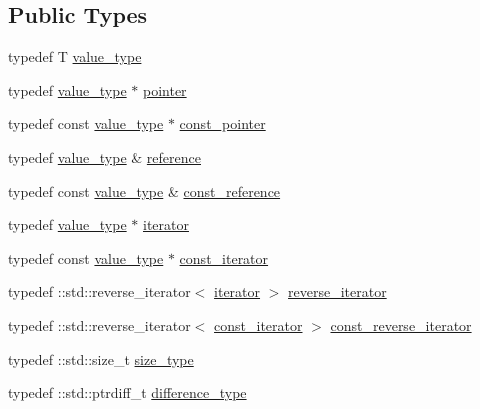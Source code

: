 \subsection*{Public Types}
\begin{DoxyCompactItemize}
\item 
typedef T \hyperlink{classtrimesh_1_1XForm_af259af02eaea86d3451dc23a47ad896c}{value\+\_\+type}
\item 
typedef \hyperlink{classtrimesh_1_1XForm_af259af02eaea86d3451dc23a47ad896c}{value\+\_\+type} $\ast$ \hyperlink{classtrimesh_1_1XForm_a0ff7a6cb20d209f32be3ab3779077029}{pointer}
\item 
typedef const \hyperlink{classtrimesh_1_1XForm_af259af02eaea86d3451dc23a47ad896c}{value\+\_\+type} $\ast$ \hyperlink{classtrimesh_1_1XForm_a0cfc3dd93b0190520e3152ef27a32117}{const\+\_\+pointer}
\item 
typedef \hyperlink{classtrimesh_1_1XForm_af259af02eaea86d3451dc23a47ad896c}{value\+\_\+type} \& \hyperlink{classtrimesh_1_1XForm_afef5285ff7d9ea2e25a4bb4d966bd674}{reference}
\item 
typedef const \hyperlink{classtrimesh_1_1XForm_af259af02eaea86d3451dc23a47ad896c}{value\+\_\+type} \& \hyperlink{classtrimesh_1_1XForm_a33bd450d8902f70aaf7d4bf9fec01502}{const\+\_\+reference}
\item 
typedef \hyperlink{classtrimesh_1_1XForm_af259af02eaea86d3451dc23a47ad896c}{value\+\_\+type} $\ast$ \hyperlink{classtrimesh_1_1XForm_a8894e55e986e53231663e774060ca200}{iterator}
\item 
typedef const \hyperlink{classtrimesh_1_1XForm_af259af02eaea86d3451dc23a47ad896c}{value\+\_\+type} $\ast$ \hyperlink{classtrimesh_1_1XForm_af342cefd0ecc382861c2d89f24423d71}{const\+\_\+iterator}
\item 
typedef \+::std\+::reverse\+\_\+iterator$<$ \hyperlink{classtrimesh_1_1XForm_a8894e55e986e53231663e774060ca200}{iterator} $>$ \hyperlink{classtrimesh_1_1XForm_a4729ea67a4ad434be421b066af3b672c}{reverse\+\_\+iterator}
\item 
typedef \+::std\+::reverse\+\_\+iterator$<$ \hyperlink{classtrimesh_1_1XForm_af342cefd0ecc382861c2d89f24423d71}{const\+\_\+iterator} $>$ \hyperlink{classtrimesh_1_1XForm_a00d4231576ef7499e29885da090e807f}{const\+\_\+reverse\+\_\+iterator}
\item 
typedef \+::std\+::size\+\_\+t \hyperlink{classtrimesh_1_1XForm_aa219f141417c9026a74dec8b6279d4bf}{size\+\_\+type}
\item 
typedef \+::std\+::ptrdiff\+\_\+t \hyperlink{classtrimesh_1_1XForm_aed93af27d498823c0b39184e9f81adec}{difference\+\_\+type}
\end{DoxyCompactItemize}
